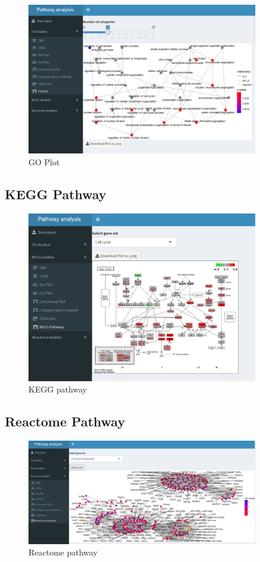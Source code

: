 \documentclass[]{article}
\begin{document}
\begin{figure}[H]
\centering
\includegraphics[width=0.9\textwidth]{App_F19_Items_GO_GOPlot.png} 
\caption{GO Plot}
\end{figure}

\subsection{KEGG Pathway}


\begin{figure}[H]
\centering
\includegraphics[width=0.9\textwidth]{App_F20_Items_KEGG_KEGGPathway.png} 
\caption{KEGG pathway}
\end{figure}

\subsection{Reactome Pathway}

\begin{figure}[H]
\centering
\includegraphics[width=0.9\textwidth]{App_F21_Items_RA_RAPathway.png} 
\caption{Reactome pathway}
\end{figure}
\end{document}
